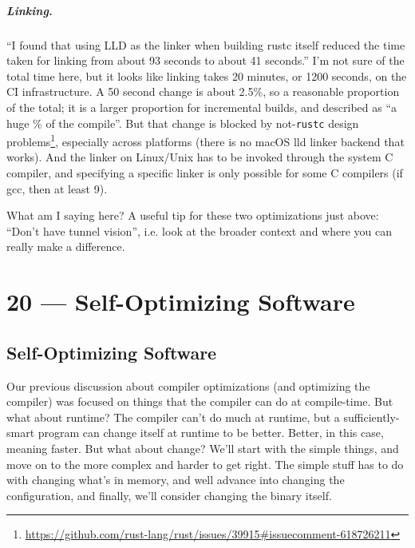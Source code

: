 \documentclass[a4paper]{report}
\begin{document}
\paragraph{Linking.}
``I found that using LLD as the linker when building rustc itself
reduced the time taken for linking from about 93 seconds to about 41
seconds.''  I'm not sure of the total time here, but it looks like
linking takes 20 minutes, or 1200 seconds, on the CI infrastructure. A
50 second change is about 2.5\%, so a reasonable proportion of the
total; it is a larger proportion for incremental builds, and described
as ``a huge \% of the compile''. But that change is blocked by
not-\texttt{rustc} design
problems\footnote{\url{https://github.com/rust-lang/rust/issues/39915\#issuecomment-618726211}},
especially across platforms (there is no macOS lld linker backend that
works).  And the linker on Linux/Unix has to be invoked through the
system C compiler, and specifying a specific linker is only possible
for some C compilers (if gcc, then at least 9).

What am I saying here? A useful tip for these two optimizations just
above: ``Don't have tunnel vision'', i.e. look at the broader context
and where you can really make a difference.









\chapter*{20 --- Self-Optimizing Software}


\section*{Self-Optimizing Software}
Our previous discussion about compiler optimizations (and optimizing the compiler) was focused on things that the compiler can do at compile-time. But what about runtime? The compiler can't do much at runtime, but a sufficiently-smart program can change itself at runtime to be better. Better, in this case, meaning faster. But what about change? We'll start with the simple things, and move on to the more complex  and harder to get right. The simple stuff has to do with changing what's in memory, and well advance into changing the configuration, and finally, we'll consider changing the binary itself.
\end{document}
